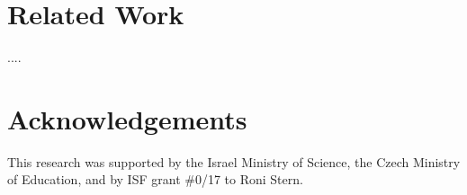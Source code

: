 \documentclass[letterpaper]{article} %
\begin{document}


\section{Related Work}
....




\section{Acknowledgements}
This research was supported by the Israel Ministry of Science, the Czech Ministry of Education, and by ISF grant \#0/17 to Roni Stern.

\clearpage


\end{document}
